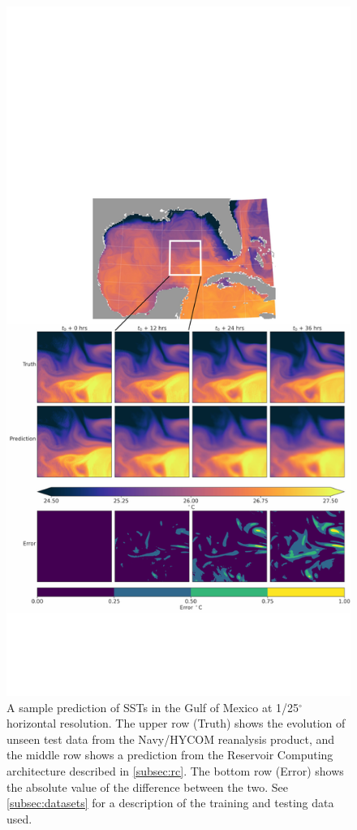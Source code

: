 \begin{figure}
    \centering
    \includegraphics[width=.8\textwidth]{../figures/rc_gom_sst.pdf}
    \caption{A sample prediction of SSTs in the Gulf of Mexico at 1/25$^\circ$
        horizontal resolution.
        The upper row (Truth) shows the evolution of unseen test data from the
        Navy/HYCOM reanalysis product, and the middle row shows a prediction
        from the Reservoir Computing architecture described in
        \cref{subsec:rc}.
        The bottom row (Error) shows the absolute value of the difference between the two.
        See \cref{subsec:datasets} for a description of the training and testing data
        used.
    }
    \label{fig:gom_sst}
\end{figure}


